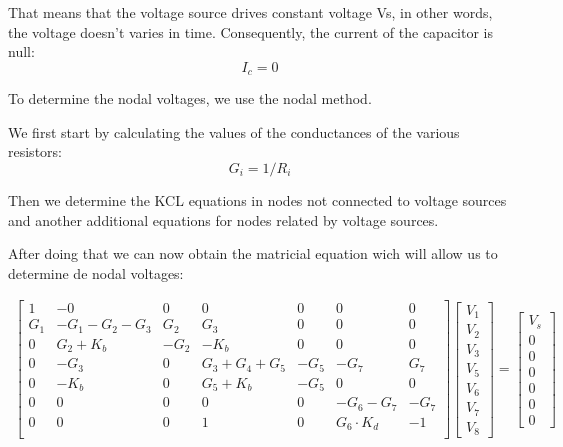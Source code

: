 That means that the voltage source drives constant voltage Vs, in other words, the voltage doesn't varies in time.
Consequently, the current of the capacitor is null:
\begin{equation}
  I_c=0
\end{equation}

To determine the nodal voltages, we use the nodal method.

We first start by calculating the values of the conductances of the various resistors:
\begin{equation}
  G_i=1/R_i
\end{equation}

Then we determine the KCL equations in nodes not connected to voltage sources and another additional equations for nodes 
related by voltage sources.

After doing that we can now obtain the matricial equation wich will allow us to determine de nodal voltages:

\begin{gather}
	\begin{bmatrix}
		1 & -0 & 0 & 0 & 0 & 0 & 0 \\
		G_1 & -G_1 - G_2 - G_3 & G_2 & G_3 & 0 & 0 & 0 \\
		0 & G_2 + K_b & -G_2 & -K_b & 0 & 0 & 0 \\
		0 & -G_3 & 0 & G_3+G_4+G_5 & -G_5 & -G_7 & G_7 \\
		0 & -K_b & 0 & G_5+K_b & -G_5 & 0 & 0 \\
		0 & 0 & 0 & 0 & 0 & -G_6-G_7 & -G_7 \\
		0 & 0 & 0 & 1 & 0 & G_6\cdot K_d & -1 \\
	\end{bmatrix}
	\begin {bmatrix} V_1 \\ V_2 \\ V_3 \\ V_5  \\ V_6 \\ V_7 \\ V_8 \end{bmatrix}
	=
	\begin {bmatrix} V_s  \\ 0  \\ 0  \\ 0 \\ 0  \\ 0 \\ 0 \end{bmatrix}
\end{gather}

